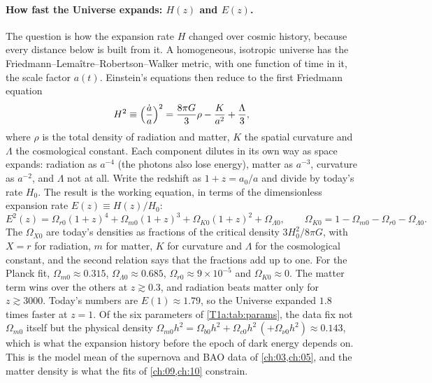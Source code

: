 \paragraph{How fast the Universe expands: $H(z)$ and $E(z)$.}
The question is how the expansion rate $H$ changed over cosmic history, because every distance below is built from it. A homogeneous, isotropic universe has the Friedmann--Lema\^itre--Robertson--Walker metric, with one function of time in it, the scale factor $a(t)$. Einstein's equations then reduce to the first Friedmann equation
\begin{equation*}
H^2\equiv\Bigl(\frac{\dot a}{a}\Bigr)^2=\frac{8\pi G}{3}\rho-\frac{K}{a^2}+\frac{\Lambda}{3},
\end{equation*}
where $\rho$ is the total density of radiation and matter, $K$ the spatial curvature and $\Lambda$ the cosmological constant. Each component dilutes in its own way as space expands: radiation as $a^{-4}$ (the photons also lose energy), matter as $a^{-3}$, curvature as $a^{-2}$, and $\Lambda$ not at all. Write the redshift as $1+z=a_0/a$ and divide by today's rate $H_0$. The result is the working equation, in terms of the dimensionless expansion rate $E(z)\equiv H(z)/H_0$:
\begin{equation*}
E^2(z)=\Omega_{r0}(1+z)^4+\Omega_{m0}(1+z)^3+\Omega_{K0}(1+z)^2+\Omega_{\Lambda0},
\qquad
\Omega_{K0}=1-\Omega_{m0}-\Omega_{r0}-\Omega_{\Lambda0}.
\end{equation*}
The $\Omega_{X0}$ are today's densities as fractions of the critical density $3H_0^2/8\pi G$, with $X=r$ for radiation, $m$ for matter, $K$ for curvature and $\Lambda$ for the cosmological constant, and the second relation says that the fractions add up to one. For the Planck fit, $\Omega_{m0}\approx0.315$, $\Omega_{\Lambda0}\approx0.685$, $\Omega_{r0}\approx9\times10^{-5}$ and $\Omega_{K0}\approx0$. The matter term wins over the others at $z\gtrsim0.3$, and radiation beats matter only for $z\gtrsim3000$. Today's numbers are $E(1)\approx1.79$, so the Universe expanded $1.8$ times faster at $z=1$. Of the six parameters of \cref{T1a:tab:params}, the data fix not $\Omega_{m0}$ itself but the physical density $\Omega_{m0}h^2=\Omega_{b0}h^2+\Omega_{c0}h^2\,(+\Omega_{\nu0}h^2)\approx0.143$, which is what the expansion history before the epoch of dark energy depends on. This is the model mean of the supernova and BAO data of \cref{ch:03,ch:05}, and the matter density is what the fits of \cref{ch:09,ch:10} constrain.

